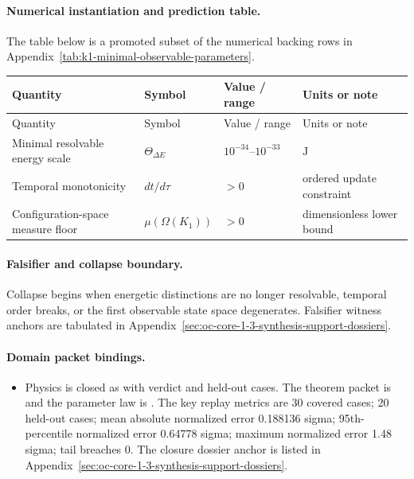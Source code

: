 \paragraph{Numerical instantiation and prediction table.}
The table below is a promoted subset of the numerical backing rows in Appendix~\ref{tab:k1-minimal-observable-parameters}.
\begin{longtable}{@{}L{0.27\textwidth}L{0.15\textwidth}L{0.24\textwidth}L{0.16\textwidth}@{}}
\toprule
Quantity & Symbol & Value / range & Units or note \\
\midrule
\endfirsthead
\toprule
Quantity & Symbol & Value / range & Units or note \\
\midrule
\endhead
Minimal resolvable energy scale & $\scriptstyle \Theta_{\Delta E}$ & $10^{-34}\text{--}10^{-33}$ & $\mathrm{J}$ \\
Temporal monotonicity & $\scriptstyle dt/\allowbreak d\tau$ & $> 0$ & ordered update constraint \\
Configuration-space measure floor & $\scriptstyle \mu(\Omega(K_1))$ & $> 0$ & dimensionless lower bound \\
\bottomrule
\end{longtable}

\paragraph{Falsifier and collapse boundary.}
Collapse begins when energetic distinctions are no longer resolvable, temporal order breaks, or the first observable state space degenerates.
Falsifier witness anchors are tabulated in Appendix~\ref{sec:oc-core-1-3-synthesis-support-dossiers}.

\paragraph{Domain packet bindings.}
\begin{itemize}[leftmargin=1.6em,nosep]
\item Physics is closed as  with verdict  and  held-out cases. The theorem packet is  and the parameter law is . The key replay metrics are 30 covered cases; 20 held-out cases; mean absolute normalized error 0.188136 sigma; 95th-percentile normalized error 0.64778 sigma; maximum normalized error 1.48 sigma; tail breaches 0. The closure dossier anchor is listed in Appendix~\ref{sec:oc-core-1-3-synthesis-support-dossiers}.
\end{itemize}

